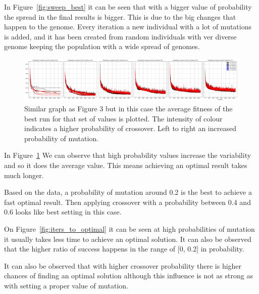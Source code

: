\documentclass[12pt,oneside,a4paper]{article}
\begin{document}
    \newline
    In Figure~\ref{fig:sweep_best} it can be seen that with a bigger value of probability the spread in the final
    results is bigger.
    This is due to the big changes that happen to the genome.
    Every iteration a new individual with a lot of mutations is added, and it has been created from random
    individuals with ver diverse genome keeping the population with a wide spread of genomes.

    \begin{figure}[h]
        \includegraphics[width=\textwidth]{sweep_values_get_avg_fitness}
        \caption{Similar graph as Figure 3 but in this case the average fitness of the best run for that set of
        values is plotted.
        The intensity of colour indicates a higher probability of crossover.
        Left to right an increased probability
        of mutation.}
        \label{fig:sweep_avg}
    \end{figure}

    \newline
    In Figure~\ref{fig:sweep_avg} We can observe that high probability values increase the variability and so it does
    the average value.
    This means achieving an optimal result takes much longer.

    Based on the data, a probability of mutation around 0.2 is the best to achieve a fast optimal result.
    Then applying crossover with a probability between 0.4 and 0.6 looks like best setting in this case.
    \newline

    On Figure~\ref{fig:iters_to_optimal} it can be seen at high probabilities of mutation it usually takes less time to
    achieve an
    optimal solution.
    It can also be observed that the higher ratio of success happens in the range of [0, 0.2] in probability.

    It can also be observed that with higher crossover probability there is higher chances of finding an optimal
    solution although this influence is not as strong as with setting a proper value of mutation.
\end{document}
